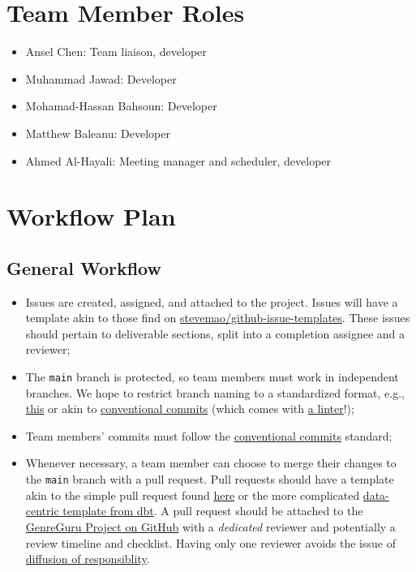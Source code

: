 \documentclass{article}
\begin{document}
\section{Team Member Roles}
\begin{itemize}
  \item Ansel Chen: Team liaison, developer
  \item Muhammad Jawad: Developer
  \item Mohamad-Hassan Bahsoun: Developer
  \item Matthew Baleanu: Developer
  \item Ahmed Al-Hayali: Meeting manager and scheduler, developer
\end{itemize}

\section{Workflow Plan}
\subsection{General Workflow}
\begin{itemize}
  \item Issues are created, assigned, and attached to the project. Issues will have a template akin to those find on \href{https://github.com/stevemao/github-issue-templates/tree/master/system/ISSUE_TEMPLATE}{stevemao/github-issue-templates}. These issues should pertain to deliverable sections, split into a completion assignee and a reviewer;
  \item The \texttt{main} branch is protected, so team members must work in independent branches. We hope to restrict branch naming to a standardized format, e.g., \href{https://dev.to/varbsan/a-simplified-convention-for-naming-branches-and-commits-in-git-il4}{this} or akin to \href{https://www.conventionalcommits.org/en/v1.0.0/}{conventional commits} (which comes with \href{https://github.com/conventional-changelog/commitlint/tree/master/%40commitlint/config-conventional}{a linter}!);
  \item Team members' commits must follow the \href{https://www.conventionalcommits.org/en/v1.0.0/}{conventional commits} standard;
  \item Whenever necessary, a team member can choose to merge their changes to the \texttt{main} branch with a pull request. Pull requests should have a template akin to the simple pull request found \href{https://graphite.dev/guides/pull-request-templates}{here} or the more complicated \href{https://github.com/dbt-labs/dbt-init/blob/master/starter-project/.github/pull_request_template.md}{data-centric template from dbt}. A pull request should be attached to the \href{https://github.com/users/AhmedAl-Hayali/projects/1}{GenreGuru Project on GitHub} with a \emph{dedicated} reviewer and potentially a review timeline and checklist. Having only one reviewer avoids the issue of \href{https://en.wikipedia.org/wiki/Diffusion_of_responsibility}{diffusion of responsiblity}.
\end{itemize}
\end{document}
